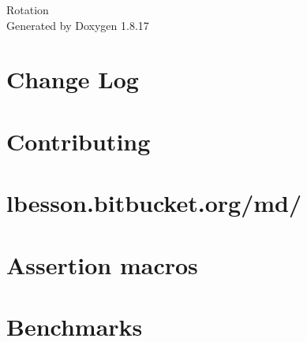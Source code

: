 \let\mypdfximage\pdfximage\def\pdfximage{\immediate\mypdfximage}\documentclass[twoside]{book}
\newcommand{\+}{\discretionary{\mbox{\scriptsize$\hookleftarrow$}}{}{}}
\newcommand{\clearemptydoublepage}{%
  \newpage{\pagestyle{empty}\cleardoublepage}%
}
\begin{document}
\hypersetup{pageanchor=false,
             bookmarksnumbered=true,
             pdfencoding=unicode
            }
\begin{titlepage}
\vspace*{7cm}
\begin{center}%
{\Large Rotation }\\
\vspace*{1cm}
{\large Generated by Doxygen 1.8.17}\\
\end{center}
\end{titlepage}
\clearemptydoublepage
{}
\tableofcontents
\clearemptydoublepage
{}
\hypersetup{pageanchor=true}

\chapter{Change Log}
\label{md_external_doctest__c_h_a_n_g_e_l_o_g}

\chapter{Contributing}
\label{md_external_doctest__c_o_n_t_r_i_b_u_t_i_n_g}

\chapter{lbesson.\+bitbucket.\+org/md/}
\label{md_external_doctest_doc_html_generated_strapdown_8js__r_e_a_d_m_e}

\chapter{Assertion macros}
\label{md_external_doctest_doc_markdown_assertions}

\chapter{Benchmarks}
\label{md_external_doctest_doc_markdown_benchmarks}

\end{document}
